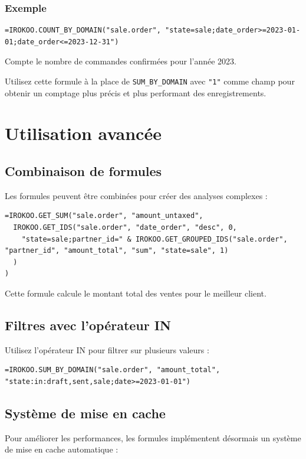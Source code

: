 \documentclass[12pt, a4paper]{article}
\begin{document}
\subsubsection{Exemple}
\begin{lstlisting}
=IROKOO.COUNT_BY_DOMAIN("sale.order", "state=sale;date_order>=2023-01-01;date_order<=2023-12-31")
\end{lstlisting}
Compte le nombre de commandes confirmées pour l'année 2023.

\begin{tip}
Utilisez cette formule à la place de \texttt{SUM\_BY\_DOMAIN} avec \texttt{"1"} comme champ pour obtenir un comptage plus précis et plus performant des enregistrements.
\end{tip}

\section{Utilisation avancée}

\subsection{Combinaison de formules}
Les formules peuvent être combinées pour créer des analyses complexes :
\begin{lstlisting}
=IROKOO.GET_SUM("sale.order", "amount_untaxed", 
  IROKOO.GET_IDS("sale.order", "date_order", "desc", 0, 
    "state=sale;partner_id=" & IROKOO.GET_GROUPED_IDS("sale.order", "partner_id", "amount_total", "sum", "state=sale", 1)
  )
)
\end{lstlisting}
Cette formule calcule le montant total des ventes pour le meilleur client.

\subsection{Filtres avec l'opérateur IN}
Utilisez l'opérateur IN pour filtrer sur plusieurs valeurs :
\begin{lstlisting}
=IROKOO.SUM_BY_DOMAIN("sale.order", "amount_total", "state:in:draft,sent,sale;date>=2023-01-01")
\end{lstlisting}

\subsection{Système de mise en cache}
Pour améliorer les performances, les formules implémentent désormais un système de mise en cache automatique :
\end{document}
